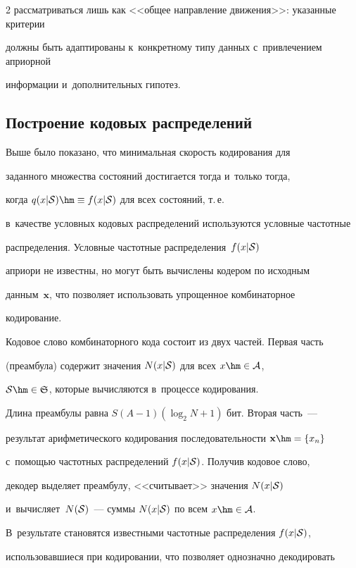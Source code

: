 \begin{multicols}{2}
рассматриваться лишь как <<общее направление движения>>: указанные критерии 

должны быть адаптированы к~конкретному типу данных с~привлечением априорной 

информации и~дополнительных гипотез.



\subsection{Построение кодовых распределений}



Выше было показано, что минимальная скорость кодирования для 

заданного множества состояний достигается тогда и~только тогда, 

когда $q(x|{\cal S})\hm\equiv f(x|{\cal S})$ для всех состояний, т.\,е.\

 в~качестве условных кодовых распределений используются условные частотные 

 распределения. Условные частотные распределения~$f(x|{\cal S})$ 

 априори не известны, но могут быть вычислены кодером по исходным 

 данным~$\mathbf{x}$, что позволяет использовать упрощенное комбинаторное 

 кодирование.



Кодовое слово комбинаторного кода состоит из двух частей. Первая часть 

(преамбула) содержит значения $N(x|{\cal S})$ для всех $x\hm\in{\cal A}$,  

${\cal S}\hm\in{\frak S}$, которые вычисляются в~процессе кодирования. 

Длина преамбулы равна $S(A-1)(\log_{2}N+1)$ бит. Вторая часть~--- 

результат арифметического кодирования последовательности $\mathbf{x}\hm=\{x_n\}$ 

с~по\-мощью частотных распределений $f(x|{\cal S})$. Получив кодовое слово, 

декодер выделяет преамбулу, <<считывает>> значения $N(x|{\cal S})$ 

и~вычисляет~$N({\cal S})$~--- суммы $N(x|{\cal S})$ по всем $x\hm\in{\cal A}$. 

В~результате становятся известными частотные распределения $f(x|{\cal S})$, 

использовавшиеся при кодировании, что позволяет однозначно декодировать 


\end{multicols}

